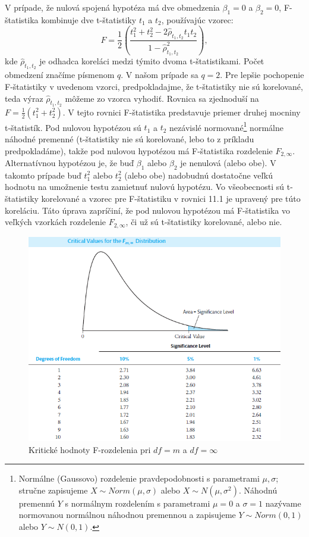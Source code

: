 \documentclass[]{tukediphc}
\begin{document}
V prípade, že nulová spojená hypotéza má dve obmedzenia $\beta_{1} = 0$ a $\beta_{2} = 0$, F-štatistika kombinuje dve t-štatistiky $t_1$ a $t_2$, používajúc vzorec:
\begin{equation}
    F = \frac{1}{2}\left(\frac{t_{1}^2+t_{2}^2-2{{\hat\rho_{t_{1},t_{2}}}}t_{1}t_{2}}{1-\hat{\rho}_{t_{1},t_{2}}^2}\right),
\end{equation}
kde $\hat\rho_{t_{1},t_{2}}$ je odhadca koreláci medzi týmito dvoma t-štatistikami. Počet obmedzení značíme písmenom $q$. V našom prípade sa $q = 2$. 
Pre lepšie pochopenie F-štatistiky v uvedenom vzorci, predpokladajme, že t-štatistiky nie sú korelované, teda výraz $\hat\rho_{t_{1},t_{2}}$ môžeme zo vzorca vyhodiť. Rovnica sa zjednoduší na $F = \frac{1}{2}(t^2_{1} + t^2_{2})$. V tejto rovnici F-štatistika predstavuje priemer druhej mocniny t-štatistík. Pod nulovou hypotézou sú $t_1$ a $t_2$ nezávislé normované\footnote{Normálne (Gaussovo) rozdelenie pravdepodobnosti s parametrami $\mu, \sigma$; stručne zapisujeme $X \sim Norm(\mu,\sigma)$ alebo $X \sim N(\mu, \sigma^2)$. Náhodnú premennú $Y$ s normálnym rozdelením s parametrami $\mu =0$ a $\sigma =1$ nazývame normovanou normálnou náhodnou premennou a zapisujeme $Y \sim Norm(0,1)$ alebo $Y \sim N(0,1)$.} normálne náhodné premenné (t-štatistiky nie sú korelované, lebo to z príkladu predpokladáme), takže pod nulovou hypotézou má F-štatistika rozdelenie $F_{2,\infty}$. Alternatívnou hypotézou je, že buď $\beta_{1}$ alebo $\beta_{2}$ je nenulová (alebo obe). V takomto prípade buď $t^2_{1}$ alebo $t^2_{2}$ (alebo obe) nadobudnú dostatočne veľkú hodnotu na umožnenie testu zamietnuť nulovú hypotézu. Vo všeobecnosti sú t-štatistiky korelované a vzorec pre F-štatistiku v rovnici 11.1 je upravený pre túto koreláciu. Táto úprava zapríčiní, že pod nulovou hypotézou má F-štatistika vo veľkých vzorkách rozdelenie $F_{2,\infty}$, či už sú t-štatistiky korelované, alebo nie. 

\begin{figure}[!ht] 
    \centering 
    \includegraphics[scale = 0.8]{diplomka obrazky/14.png} 
    \caption{Kritické hodnoty F-rozdelenia pri $df = m$ a $df = \infty$} 
\end{figure} 
\end{document}
